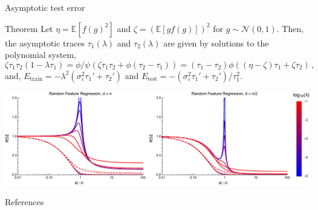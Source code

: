 \documentclass[10pt, aspectratio=169]{beamer}
\begin{document}
\begin{frame}[t]{Asymptotic test error}
\begin{alertblock}{Theorem}
Let $\eta = \mathbb{E}[f(g)^2]$ and $\zeta = (\mathbb{E}[g f(g)])^2$ for $g\sim \mathcal{N}(0,1)$. Then, the asymptotic traces $\tau_1(\lambda)$ and $\tau_2(\lambda)$ are given by solutions to the polynomial system,
\begin{equation*}
  \zeta  \tau_1 \tau_2
   \left(1-\lambda \tau_1\right) = \phi/\psi\left(\zeta  \tau_1 \tau_2 + \phi(\tau_2 -\tau_1) \right) = \left(\tau_1-\tau_2\right) \phi  \left((\eta-\zeta)\tau_1+\zeta \tau_2\right)\,,
\end{equation*}
and, $E_{\text{train}} = -\lambda^2(\sigma_\varepsilon^2 \tau_1' + \tau_2')$ and $E_{\text{test}} = -(\sigma_\varepsilon^2 \tau_1' + \tau_2')/\tau_1^2$.
\end{alertblock}
\begin{center}
\includegraphics[width=0.9\linewidth]{part-4-images/RF_plots.pdf}
\end{center}
\end{frame}


\appendix



\begin{frame}[allowframebreaks]{References}

  
  {\scriptsize}

\end{frame}
\end{document}
